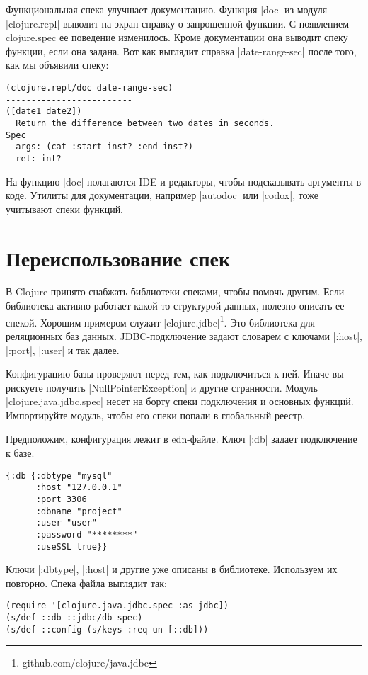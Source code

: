 Функциональная спека улучшает документацию. Функция \spverb|doc| из модуля
\spverb|clojure.repl| выводит на экран справку о запрошенной функции. С
появлением clojure.spec ее поведение изменилось. Кроме документации она выводит
спеку функции, если она задана. Вот как выглядит справка \spverb|date-range-sec|
после того, как мы объявили спеку:

\begin{verbatim}
(clojure.repl/doc date-range-sec)
-------------------------
([date1 date2])
  Return the difference between two dates in seconds.
Spec
  args: (cat :start inst? :end inst?)
  ret: int?
\end{verbatim}

На функцию \spverb|doc| полагаются IDE и редакторы, чтобы подсказывать аргументы
в коде. Утилиты для документации, например \spverb|autodoc| или \spverb|codox|,
тоже учитывают спеки функций.

\section{Переиспользование спек}

В Clojure принято снабжать библиотеки спеками, чтобы помочь другим. Если
библиотека активно работает какой-то структурой данных, полезно описать ее
спекой. Хорошим примером служит \spverb|clojure.jdbc|\footnote{github.com/clojure/java.jdbc}.
Это библиотека для реляционных баз данных. JDBC-подключение задают словарем с ключами
\spverb|:host|, \spverb|:port|, \spverb|:user| и так далее.

Конфигурацию базы проверяют перед тем, как подключиться к ней. Иначе вы рискуете
получить \spverb|NullPointerException| и другие странности. Модуль
\spverb|clojure.java.jdbc.spec| несет на борту спеки подключения и основных
функций. Импортируйте модуль, чтобы его спеки попали в глобальный реестр.

Предположим, конфигурация лежит в edn-файле. Ключ \spverb|:db| задает
подключение к базе.

\begin{verbatim}
{:db {:dbtype "mysql"
      :host "127.0.0.1"
      :port 3306
      :dbname "project"
      :user "user"
      :password "********"
      :useSSL true}}
\end{verbatim}

Ключи \spverb|:dbtype|, \spverb|:host| и другие уже описаны в библиотеке.
Используем их повторно. Спека файла выглядит так:

\begin{verbatim}
(require '[clojure.java.jdbc.spec :as jdbc])
(s/def ::db ::jdbc/db-spec)
(s/def ::config (s/keys :req-un [::db]))
\end{verbatim}

